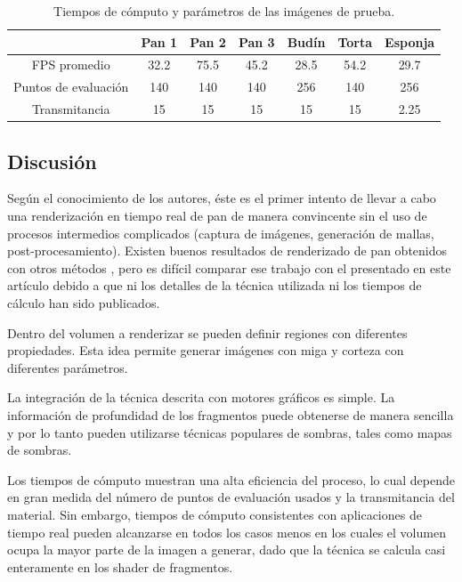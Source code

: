\documentclass[oneside,a4paper,spanish,links]{amca}
\begin{document}
\begin{table}[htb]
\centering
\begin{tabular}{|c|c|c|c|c|c|c|}
\hline &  Pan 1 & Pan 2 & Pan 3 & Budín & Torta & Esponja \\
\hline
\hline
 FPS promedio  & 32.2 &  75.5 &  45.2 & 28.5 &  54.2 & 29.7\\
\hline
 Puntos de evaluación &  140 &  140 &  140 & 256 &  140 & 256 \\
\hline
 Transmitancia &  15 &  15 &  15 & 15 &  15 & 2.25 \\
\hline
\end{tabular}
\caption{Tiempos de cómputo y parámetros de las imágenes de prueba.}
\label{tab:n1}
\end{table}

\subsection{Discusi\'on}

Según el conocimiento de los autores, éste es el primer intento de llevar a cabo una renderización en tiempo real de pan de manera convincente sin el uso de procesos
intermedios complicados (captura de imágenes, generación de mallas,
post-procesamiento). Existen buenos resultados de renderizado de pan
obtenidos con otros métodos \citep{Cho2007}, pero es difícil
comparar ese trabajo con el presentado en este artículo debido a que
ni los detalles de la técnica utilizada ni los tiempos de cálculo han
sido publicados.

Dentro del volumen a renderizar se pueden definir regiones
con diferentes propiedades. Esta idea permite generar
imágenes con miga y corteza con diferentes parámetros.

La integración de la técnica descrita con motores gráficos es
simple. La información de profundidad de los fragmentos puede obtenerse de manera sencilla y por lo tanto pueden utilizarse técnicas
populares de sombras, tales como mapas de sombras.

Los tiempos de cómputo muestran una alta eficiencia del proceso, lo
cual depende en gran medida del número de puntos de evaluación usados
y la transmitancia del material. Sin embargo, tiempos de cómputo
consistentes con aplicaciones de tiempo real pueden alcanzarse en
todos los casos menos en los cuales el volumen ocupa la mayor parte de
la imagen a generar, dado que la técnica se calcula casi enteramente
en los shader de fragmentos. 
\end{document}
